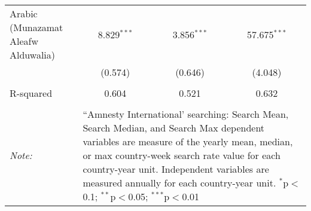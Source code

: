 \begin{table}[!htbp]
\begin{tabular}{@{\extracolsep{5pt}}lccc}
  Arabic (Munazamat Aleafw Alduwalia) & 8.829$^{***}$ & 3.856$^{***}$ & 57.675$^{***}$ \\ 
  & (0.574) & (0.646) & (4.048) \\ 
 \hline \\[-1.8ex] 
R-squared  & 0.604 & 0.521 & 0.632 \\ 
\hline 
\hline \\[-1.8ex] 
\textit{Note:}  & \multicolumn{3}{l}{\parbox[t]{8cm}{``Amnesty International' searching: Search Mean, Search Median, and Search Max dependent variables are measure of the yearly mean, median, or max country-week search rate value for each country-year unit. Independent variables are measured annually for each country-year unit. $^{*}$p$<$0.1; $^{**}$p$<$0.05; $^{***}$p$<$0.01}} \\ 
\end{tabular} 
\end{table} 
